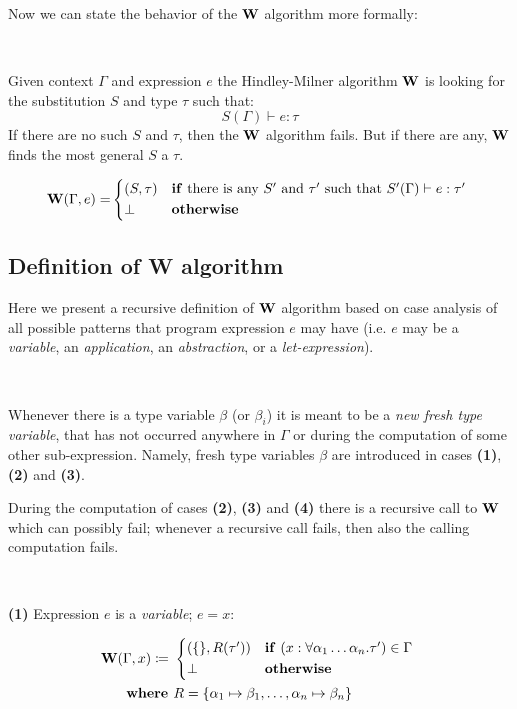 \documentclass[a4paper,oneside]{memoir}
\begin{document}
Now we can state the behavior of the $\operatorname{\textbf{W}}$ algorithm more formally:

~

Given context $\Gamma$ and expression $e$ the Hindley-Milner algorithm $\operatorname{\textbf{W}}$ 
is looking for the substitution $S$ and type $\tau$ such that: 
$$ S(\Gamma) \vdash e : \tau $$
If there are no such $S$ and $\tau$, then the $\operatorname{\textbf{W}}$ algorithm fails.
But if there are any, $\operatorname{\textbf{W}}$ finds the most general $S$ a $\tau$.


\begin{align*}
\W(\Gamma, e) = &
\begin{cases*}
  (S, \tau) 
  & \textbf{if} there is any $\SPr$ and $\tauPr$ such that $S^\prime(\Gamma) \vdash e : \tauPr$  \\
  \bot & \textbf{otherwise}
\end{cases*}\\
\end{align*}




\subsection{Definition of W algorithm}

Here we present a recursive definition of $\operatorname{\textbf{W}}$ algorithm based on case analysis of all possible patterns that program expression $e$ may have 
(i.e. $e$ may be a \textit{variable}, an \textit{application}, an \textit{abstraction}, or a \textit{let-expression}). 

~

Whenever there is a type variable $\beta$ (or $\beta_i$) it is meant to be a \textit{new fresh type variable}, that has not occurred anywhere in $\Gamma$ or during the computation of some other sub-expression. Namely, fresh type variables $\beta$ are introduced in cases \textbf{(1)}, \textbf{(2)} and \textbf{(3)}. 

During the computation of cases \textbf{(2)}, \textbf{(3)} and \textbf{(4)} there is a recursive call to $\operatorname{\textbf{W}}$ which can possibly fail; whenever a recursive call fails, then also the calling computation fails.

~

\textbf{(1)} Expression $e$ is a \textit{variable}; $e = x$:

\begin{align*}
\W(\Gamma, x) \defi ~ &
\begin{cases*}
  (\{\}, R(\tauPr) ) 
  & \textbf{if} $(x : \forall \alpha_1 \dots \alpha_n.\tauPr) \in \Gamma$  \\
  \bot & \textbf{otherwise}
\end{cases*}\\
\where & R = \{\alpha_1 \mapsto \beta_1, \dots, \alpha_n \mapsto \beta_n\} \\
\end{align*}
\end{document}
